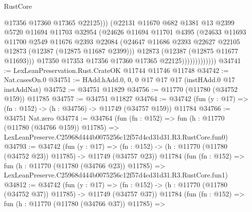 \begin{lexlean}{RustCore}
\begin{coremodule}
                                @17356
                                @17360
                                @17365
                                @22125)))
                          (@22131
                            @11670
                            @682
                            @1381
                            @13
                            @2399
                            @5720
                            @11694
                            @11703
                            @32954
                            (@24626
                              @11694
                              @11701
                              @4395
                              (@24633
                                @11693
                                @11700
                                @2549
                                @11676
                                @2393
                                @22084
                                (@24647
                                  @11686
                                  @2393
                                  @22627
                                  @22105
                                  @12873
                                  (@12387 (@12875 @11687 @2399)))
                                @12873
                                (@12387 (@12875 @11677 @11693)))
                              @17350
                              @17353
                              @17356
                              @17360
                              @17365
                              @22125)))))))))))))
@34741 := LexLeanPreservation.Rust.CrateOK @11744 @11746 @11748
@34742 := Nat.casesOn.{0}
@34751 := HAdd.hAdd.{0, 0, 0} @17 @17 @17 (instHAdd.{0} @17 instAddNat)
@34752 := @34751 @11829
@34756 := @11770 (@11780 (@34752 @159)) @11785
@34757 := @34751 @11827
@34764 := @34742 (fun (y : @17) => (fn : @152) -> (h : @34756) -> @11749 (@34757 @159)) @11784
@34766 := @34751 Nat.zero
@34774 := @34764
    (fun (fn : @152) =>
    fun (h : @11770 (@11780 (@34766 @159)) @11785) =>
    LexLeanPreserve.C25968d444b0075256c12f57d4cd31d31.R3.RustCore.fun0)
@34793 := @34742
    (fun (y : @17) =>
    (fn : @152) -> (h : @11770 (@11780 (@34752 @23)) @11785) -> @11749 (@34757 @23))
    @11784
    (fun (fn : @152) =>
    fun (h : @11770 (@11780 (@34766 @23)) @11785) =>
    LexLeanPreserve.C25968d444b0075256c12f57d4cd31d31.R3.RustCore.fun1)
@34812 := @34742
    (fun (y : @17) =>
    (fn : @152) -> (h : @11770 (@11780 (@34752 @37)) @11785) -> @11749 (@34757 @37))
    @11784
    (fun (fn : @152) =>
    fun (h : @11770 (@11780 (@34766 @37)) @11785) =>

\end{coremodule}
\end{lexlean}
